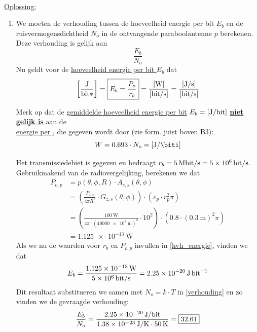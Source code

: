 \documentclass{kuburgiearticle}
\let\epsilon\varepsilon
\begin{document}
	\hfill \\
	\underline{Oplossing:}
	\begin{enumerate}
		\item We moeten de verhouding tussen de hoeveelheid energie per bit \(E_b\) en de ruisvermogensdichtheid \(N_o\) in de ontvangende paraboolantenne \(p\) berekenen. Deze verhouding is gelijk aan \begin{equation}
			\frac{E_b}{N_o} \label{verhouding}
		\end{equation} Nu geldt voor de \underline{hoeveelheid energie per bit \(E_b\)} dat \begin{equation}
			\left[\frac{\unit{\joule}}{\unit{\bit*}}\right] = \boxed{E_b = \frac{P_o}{r_b}} = \frac{[\unit{\watt}]}{[\unit{\bit/\second}]} = \frac{[\unit{\joule/\second}]}{[\unit{bit/\second}]} \label{hvh_energie}
		\end{equation}

		Merk op dat de \underline{gemiddelde hoeveelheid energie per bit} \(E_b = [\unit{\joule/\bit}]\) \underline{\textbf{niet gelijk is}} aan de \\\underline{energie per \unit{\biti}}, die gegeven wordt door (zie form. juist boven B3): \[W=0.693 \cdot N_o = \left[\unit{\joule\per\biti}\right]\]

		Het transmissiedebiet is gegeven en bedraagt \(r_b=\SI{5}{\mega\bit/\second}=\SI{5e6}{\bit/\second}\).\\ Gebruikmakend van de radiovergelijking, berekenen we dat \begin{align*}
			P_{o,p} &= p(\theta,\phi,R) \cdot A_{e,s}(\theta,\phi) \\
			&= \left(\frac{P_{z,s}}{4\pi R^2} \cdot G_{z,s}(\theta,\phi) \right) \cdot \left( \epsilon_p \cdot r_p^2 \pi \right) \\
			&= \left(\frac{\SI{100}{\watt}}{4\pi \cdot (\SI{40000e3}{\meter})^2} \cdot 10^2 \right) \cdot \left( 0.8 \cdot (\SI{0.3}{\meter})^2 \pi \right) \\
			&= \SI{1.125e-13}{\watt}
		\end{align*}
		Als we nu de waarden voor \(r_b\) en \(P_{o,p}\) invullen in \eqref{hvh_energie}, vinden we dat \begin{equation*}
			E_b = \frac{\SI{1.125e-13}{\watt}}{\SI{5e6}{\bit/\second}} = \SI{2.25e-20}{\joule\per\bit}
		\end{equation*} Dit resultaat substitueren we samen met \(N_o = k\cdot T \) in \eqref{verhouding} en zo vinden we de gevraagde verhouding: \begin{equation*}
		\frac{E_b}{N_o} = \frac{\SI{2.25e-20}{\joule/\bit}}{\SI{1.38e-23}{\joule/\kelvin}\cdot\SI{50}{\kelvin}} = \boxed{32.61}
		\end{equation*}


\end{enumerate}
\end{document}
